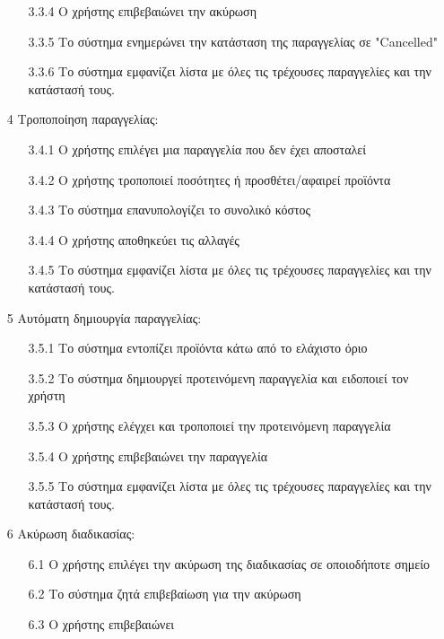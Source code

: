 \documentclass[12pt,a4paper,twoside]{book}
\begin{document}
\begin{enumerate}
\begin{enumerate}
          \item[3.3.4 ] Ο χρήστης επιβεβαιώνει την ακύρωση
          \item[3.3.5 ] Το σύστημα ενημερώνει την κατάσταση της παραγγελίας σε "Cancelled" %
          \item[3.3.6] Το σύστημα εμφανίζει λίστα με όλες τις τρέχουσες παραγγελίες και την κατάστασή τους.
        \end{enumerate}
  \item[4 ] Τροποποίηση παραγγελίας:
        \begin{enumerate}
          \item[3.4.1 ] Ο χρήστης επιλέγει μια παραγγελία που δεν έχει αποσταλεί %
          \item[3.4.2 ] Ο χρήστης τροποποιεί ποσότητες ή προσθέτει/αφαιρεί προϊόντα
          \item[3.4.3 ] Το σύστημα επανυπολογίζει το συνολικό κόστος
          \item[3.4.4 ] Ο χρήστης αποθηκεύει τις αλλαγές
          \item[3.4.5 ] Το σύστημα εμφανίζει λίστα με όλες τις τρέχουσες παραγγελίες και την κατάστασή τους.
        \end{enumerate}
  \item[5 ] Αυτόματη δημιουργία παραγγελίας: %
        \begin{enumerate}
          \item[3.5.1 ] Το σύστημα εντοπίζει προϊόντα κάτω από το ελάχιστο όριο
          \item[3.5.2 ] Το σύστημα δημιουργεί προτεινόμενη παραγγελία και ειδοποιεί τον χρήστη %
          \item[3.5.3 ] Ο χρήστης ελέγχει και τροποποιεί την προτεινόμενη παραγγελία
          \item[3.5.4 ] Ο χρήστης επιβεβαιώνει την παραγγελία
          \item[3.5.5 ] Το σύστημα εμφανίζει λίστα με όλες τις τρέχουσες παραγγελίες και την κατάστασή τους.
        \end{enumerate}
  \item[6 ] Ακύρωση διαδικασίας: %
        \begin{enumerate}
          \item[6.1 ] Ο χρήστης επιλέγει την ακύρωση της διαδικασίας σε οποιοδήποτε σημείο %
          \item[6.2 ] Το σύστημα ζητά επιβεβαίωση για την ακύρωση
          \item[6.3 ] Ο χρήστης επιβεβαιώνει

\end{enumerate}
\end{enumerate}
\end{document}
